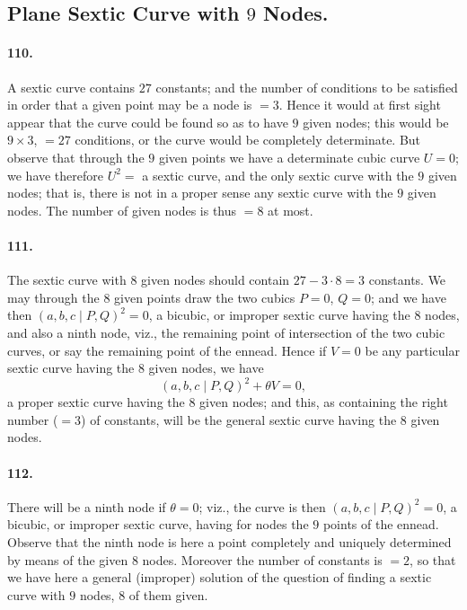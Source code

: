 \documentclass[11pt,a4paper]{article}
\begin{document}
\subsection*{Plane Sextic Curve with $9$ Nodes.}

\paragraph{110.}
A sextic curve contains $27$ constants; and the number of conditions to be
satisfied in order that a given point may be a node is $= 3$. Hence it would
at first sight appear that the curve could be found so as to have $9$ given
nodes; this would be $9 \times 3$, $= 27$ conditions, or the curve would be
completely determinate. But observe that through the $9$ given points we
have a determinate cubic curve $U = 0$; we have therefore $U^2 = $ a sextic
curve, and the only sextic curve with the $9$ given nodes; that is, there
is not in a proper sense any sextic curve with the $9$ given nodes. The
number of given nodes is thus $= 8$ at most.

\paragraph{111.}
The sextic curve with $8$ given nodes should contain $27 - 3 \cdot 8 = 3$
constants. We may through the $8$ given points draw the two cubics
$P = 0$, $Q = 0$; and we have then $(a, b, c \! \mid \! P, Q)^2 = 0$, a
bicubic, or improper sextic curve having the $8$ nodes, and also a ninth
node, viz., the remaining point of intersection of the two cubic curves,
or say the remaining point of the ennead. Hence if $V = 0$ be any
particular sextic curve having the $8$ given nodes, we have
\[
(a, b, c \mid P, Q)^2 + \theta V = 0,
\]
a proper sextic curve having the $8$ given nodes; and this, as containing
the right number ($= 3$) of constants, will be the general sextic curve
having the $8$ given nodes.

\paragraph{112.}
There will be a ninth node if $\theta = 0$; viz., the curve is then
$(a, b, c \mid P, Q)^2 = 0$, a bicubic, or improper sextic curve, having
for nodes the $9$ points of the ennead. Observe that the ninth node is
here a point completely and uniquely determined by means of the given $8$
nodes. Moreover the number of constants is $= 2$, so that we have here a
general (improper) solution of the question of finding a sextic curve with
$9$ nodes, $8$ of them given.
\end{document}

